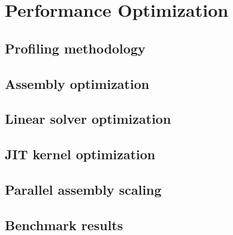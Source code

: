\chapter{Performance Optimization}
\label{ch:performance}

\section{Profiling methodology}
\label{sec:perf:profiling}


\section{Assembly optimization}
\label{sec:perf:assembly}


\section{Linear solver optimization}
\label{sec:perf:solver}


\section{JIT kernel optimization}
\label{sec:perf:jit}


\section{Parallel assembly scaling}
\label{sec:perf:parallel}


\section{Benchmark results}
\label{sec:perf:results}

